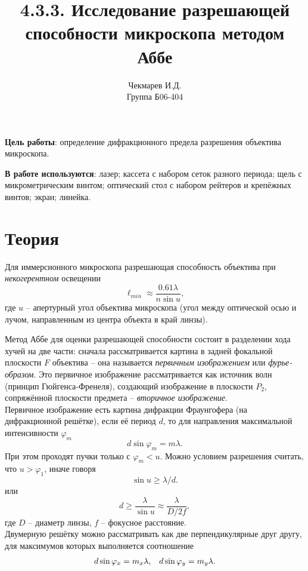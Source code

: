 \documentclass[a4paper,12pt]{article}
\author{Чекмарев И.Д.\\
Группа Б06-404}
\title{4.3.3. Исследование разрешающей способности микроскопа методом Аббе}
\date{}
\begin{document}
\maketitle
\textbf{Цель работы}: определение дифракционного предела разрешения объектива микроскопа.


\textbf{В работе используются}: лазер; кассета с набором сеток разного периода; щель с микрометрическим винтом; оптический стол с набором рейтеров и крепёжных винтов; экран; линейка.
\section*{Теория}
Для иммерсионного микроскопа разрешающая способность объектива при \textit{некогерентном} освещении
\begin{equation}
\ell_{min} \approx \dfrac{0.61\lambda}{n \sin u},
\end{equation}
где $u$ -- апертурный угол объектива микроскопа (угол между оптической осью и лучом, направленным из центра объекта в край линзы).

Метод Аббе для оценки разрешающей способности состоит в разделении хода хучей на две части: сначала рассматривается картина в задней фокальной плоскости $F$ объектива -- она называется \textit{первичным изображением} или \textit{фурье-образом}. Это первичное изображение рассматривается как источник волн (принцип Гюйгенса-Френеля), создающий изображение в плоскости $P_2$, сопряжённой плоскости предмета -- \textit{вторичное изображение}.\\
Первичное изображение есть картина дифракции Фраунгофера (на дифракционной решётке), если её период $d$, то для направления максимальной интенсивности $\varphi_m$
\begin{equation}
d \sin \varphi_m = m\lambda.
\end{equation}
При этом проходят пучки только с $\varphi_m < u$. Можно условием разрешения считать, что $u > \varphi_1$, иначе говоря
$$
\sin u \geq \lambda/d.
$$
или
\begin{equation}
d \geq \dfrac{\lambda}{\sin u} \approx \dfrac{\lambda}{D/2f},
\end{equation}
где $D$ -- диаметр линзы, $f$ -- фокусное расстояние.\\
Двумерную решётку можно рассматривать как две перпендикулярные друг другу, для максимумов которых выполняется соотношение
\begin{equation}
\begin{array}{c c}
d\sin \varphi_x = m_x \lambda, & d\sin \varphi_y = m_y \lambda. \\
\end{array}
\end{equation}
\newpage
\end{document}
